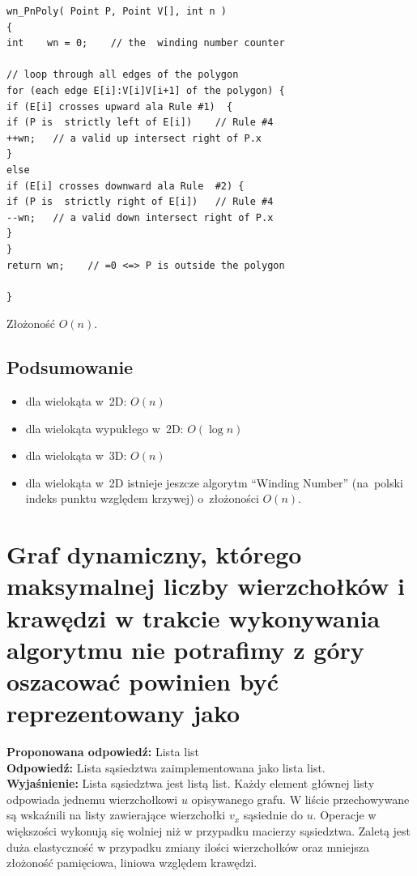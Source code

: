\begin{lstlisting}
wn_PnPoly( Point P, Point V[], int n )
{
int    wn = 0;    // the  winding number counter

// loop through all edges of the polygon
for (each edge E[i]:V[i]V[i+1] of the polygon) {
if (E[i] crosses upward ala Rule #1)  {
if (P is  strictly left of E[i])    // Rule #4
++wn;   // a valid up intersect right of P.x
}
else
if (E[i] crosses downward ala Rule  #2) {
if (P is  strictly right of E[i])   // Rule #4
--wn;   // a valid down intersect right of P.x
}
}
return wn;    // =0 <=> P is outside the polygon

}
\end{lstlisting}

Złożoność $O(n)$.
\subsection{Podsumowanie}
\begin{itemize}
	\item dla wielokąta w~2D: $O(n)$
	\item dla wielokąta wypukłego w~2D: $O(\log n)$
	\item dla wielokąta w~3D: $O(n)$
	\item dla wielokąta w~2D istnieje jeszcze algorytm ``Winding Number'' (na~polski indeks punktu względem krzywej) o~złożoności $O(n)$.
\end{itemize}




\section{Graf dynamiczny, którego maksymalnej liczby wierzchołków i krawędzi w trakcie wykonywania algorytmu nie potrafimy z góry oszacować powinien być reprezentowany jako}


\vspace{0.4cm}
\noindent \textbf{Proponowana odpowiedź:} Lista list \\ 

\noindent \textbf{Odpowiedź:} Lista sąsiedztwa zaimplementowana jako lista list. \\

\noindent \textbf{Wyjaśnienie:}
Lista sąsiedztwa jest listą list. Każdy element głównej listy odpowiada jednemu wierzchołkowi $u$ opisywanego grafu. W liście przechowywane są wskaźnili na listy zawierające wierzchołki $v_x$ sąsiednie do $u$. Operacje w większości wykonują się wolniej niż w przypadku macierzy sąsiedztwa. Zaletą jest duża elastyczność w przypadku zmiany ilości wierzchołków oraz mniejsza złożoność pamięciowa, liniowa względem krawędzi.



